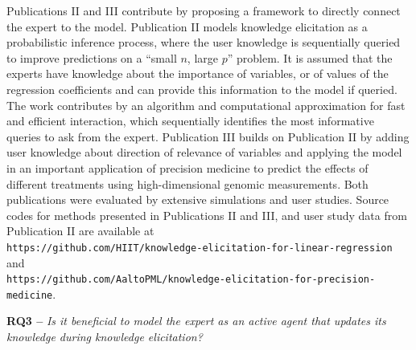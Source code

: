 \documentclass[dissertation,math,vertlayout,pdfa,colorlinks]{aaltoseries}
\begin{document}
Publications II and III contribute by proposing a framework to directly connect the expert to the model. Publication II models knowledge elicitation as a probabilistic inference process, where the user knowledge is sequentially queried to improve predictions on a ``small $n$, large $p$'' problem.  %
It is assumed that the experts have knowledge about the importance of variables, or of values of the regression coefficients and can provide this information to the model if queried. The work contributes by an algorithm and computational approximation for fast and efficient interaction, which sequentially identifies the most informative queries to ask from the expert. Publication III builds on Publication II by adding user knowledge about direction of relevance of variables and applying the model in an important application of precision medicine to predict the effects of different treatments using high-dimensional genomic measurements. Both publications were evaluated by extensive simulations and user studies. 
Source codes for methods presented in Publications II and III, and user study data from Publication II are available at \\ \texttt{https://github.com/HIIT/knowledge-elicitation-for-linear-regression} and \\ \texttt{https://github.com/AaltoPML/knowledge-elicitation-for-precision-medicine}.





\noindent \textbf{RQ3 --} \textit{Is it beneficial to model the expert as an active agent that updates its knowledge during knowledge elicitation?}
\end{document}
